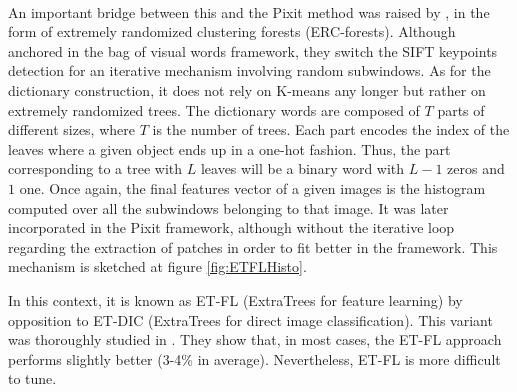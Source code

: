\documentclass[a4paper]{report}
\begin{document}
\paragraph{}
An important bridge between this and the Pixit method was raised by \cite{ETFL}, in the form of extremely randomized clustering forests (ERC-forests). Although anchored in the bag of visual words framework, they switch the SIFT keypoints detection for an iterative mechanism involving random subwindows. As for the dictionary construction, it does not rely on K-means any longer but rather on extremely randomized trees. The dictionary words are composed of $T$ parts of different sizes, where $T$  is the number of trees.
Each part encodes the index of the leaves where a given object ends up in a one-hot fashion. Thus, the part corresponding to a tree with $L$ leaves will be a binary word with $L-1$ zeros and $1$ one. Once again, the final features vector of a given images is the histogram computed over all the subwindows belonging to that image.
It was later incorporated in the Pixit framework, although without the iterative loop regarding the extraction of patches in order to fit better in the framework. This mechanism is sketched at figure \ref{fig:ETFLHisto}. 
\par
In this context, it is known as ET-FL (ExtraTrees for feature learning) by opposition to ET-DIC (ExtraTrees for direct image classification). This variant was thoroughly studied in \cite{base}. They show that, in most cases, the ET-FL approach performs slightly better (3-4\% in average). Nevertheless, ET-FL is more difficult to tune.
\end{document}
